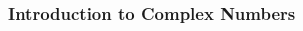 \documentclass[12pt]{book}
\theoremstyle{definition}
\begin{document}
\begin{multicols}{4}
\end{multicols}

\subsubsection{Introduction to Complex Numbers}

\end{document}
